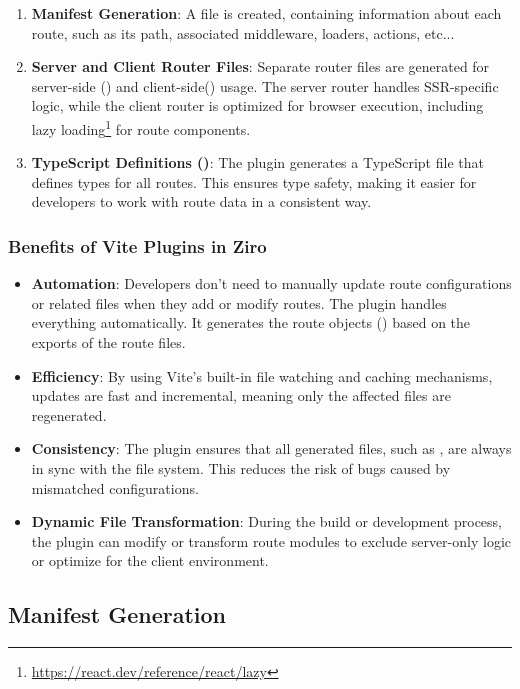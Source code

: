 \begin{enumerate}
	\item \textbf{Manifest Generation}: A  file is created, containing information about each route, such as its path, associated middleware, loaders, actions, etc...
	\item \textbf{Server and Client Router Files}: Separate router files are generated for server-side () and client-side() usage. The server router handles SSR-specific logic, while the client router is optimized for browser execution, including lazy loading\footnote{\url{https://react.dev/reference/react/lazy}} for route components.
	\item \textbf{TypeScript Definitions ()}: The plugin generates a TypeScript file that defines types for all routes. This ensures type safety, making it easier for developers to work with route data in a consistent way.
\end{enumerate}

\subsubsection{Benefits of Vite Plugins in Ziro}
\begin{itemize}
	\item \textbf{Automation}: Developers don’t need to manually update route configurations or related files when they add or modify routes. The plugin handles everything automatically. It generates the route objects () based on the exports of the route files.
	\item \textbf{Efficiency}: By using Vite's built-in file watching and caching mechanisms, updates are fast and incremental, meaning only the affected files are regenerated.
	\item \textbf{Consistency}: The plugin ensures that all generated files, such as , are always in sync with the file system. This reduces the risk of bugs caused by mismatched configurations.
	\item \textbf{Dynamic File Transformation}: During the build or development process, the plugin can modify or transform route modules to exclude server-only logic or optimize for the client environment.
\end{itemize}

\subsection{Manifest Generation}

